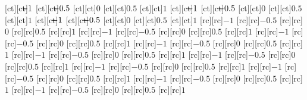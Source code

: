 [ct][ct]{\matlabtextA $\matlabfragNegXTick 1$}%
[ct][ct]{\matlabtextA $\matlabfragNegXTick 0.5$}%
[ct][ct]{\matlabtextA $0$}%
[ct][ct]{\matlabtextA $0.5$}%
[ct][ct]{\matlabtextA $1$}%
[ct][ct]{\matlabtextA $\matlabfragNegXTick 1$}%
[ct][ct]{\matlabtextA $\matlabfragNegXTick 0.5$}%
[ct][ct]{\matlabtextA $0$}%
[ct][ct]{\matlabtextA $0.5$}%
[ct][ct]{\matlabtextA $1$}%
[ct][ct]{\matlabtextA $\matlabfragNegXTick 1$}%
[ct][ct]{\matlabtextA $\matlabfragNegXTick 0.5$}%
[ct][ct]{\matlabtextA $0$}%
[ct][ct]{\matlabtextA $0.5$}%
[ct][ct]{\matlabtextA $1$}%
%
%
%
[rc][rc]{\matlabtextA $-1$}%
[rc][rc]{\matlabtextA $-0.5$}%
[rc][rc]{\matlabtextA $0$}%
[rc][rc]{\matlabtextA $0.5$}%
[rc][rc]{\matlabtextA $1$}%
[rc][rc]{\matlabtextA $-1$}%
[rc][rc]{\matlabtextA $-0.5$}%
[rc][rc]{\matlabtextA $0$}%
[rc][rc]{\matlabtextA $0.5$}%
[rc][rc]{\matlabtextA $1$}%
[rc][rc]{\matlabtextA $-1$}%
[rc][rc]{\matlabtextA $-0.5$}%
[rc][rc]{\matlabtextA $0$}%
[rc][rc]{\matlabtextA $0.5$}%
[rc][rc]{\matlabtextA $1$}%
[rc][rc]{\matlabtextA $-1$}%
[rc][rc]{\matlabtextA $-0.5$}%
[rc][rc]{\matlabtextA $0$}%
[rc][rc]{\matlabtextA $0.5$}%
[rc][rc]{\matlabtextA $1$}%
[rc][rc]{\matlabtextA $-1$}%
[rc][rc]{\matlabtextA $-0.5$}%
[rc][rc]{\matlabtextA $0$}%
[rc][rc]{\matlabtextA $0.5$}%
[rc][rc]{\matlabtextA $1$}%
[rc][rc]{\matlabtextA $-1$}%
[rc][rc]{\matlabtextA $-0.5$}%
[rc][rc]{\matlabtextA $0$}%
[rc][rc]{\matlabtextA $0.5$}%
[rc][rc]{\matlabtextA $1$}%
[rc][rc]{\matlabtextA $-1$}%
[rc][rc]{\matlabtextA $-0.5$}%
[rc][rc]{\matlabtextA $0$}%
[rc][rc]{\matlabtextA $0.5$}%
[rc][rc]{\matlabtextA $1$}%
[rc][rc]{\matlabtextA $-1$}%
[rc][rc]{\matlabtextA $-0.5$}%
[rc][rc]{\matlabtextA $0$}%
[rc][rc]{\matlabtextA $0.5$}%
[rc][rc]{\matlabtextA $1$}%
[rc][rc]{\matlabtextA $-1$}%
[rc][rc]{\matlabtextA $-0.5$}%
[rc][rc]{\matlabtextA $0$}%
[rc][rc]{\matlabtextA $0.5$}%
[rc][rc]{\matlabtextA $1$}%
[rc][rc]{\matlabtextA $-1$}%
[rc][rc]{\matlabtextA $-0.5$}%
[rc][rc]{\matlabtextA $0$}%
[rc][rc]{\matlabtextA $0.5$}%
[rc][rc]{\matlabtextA $1$}%
%
